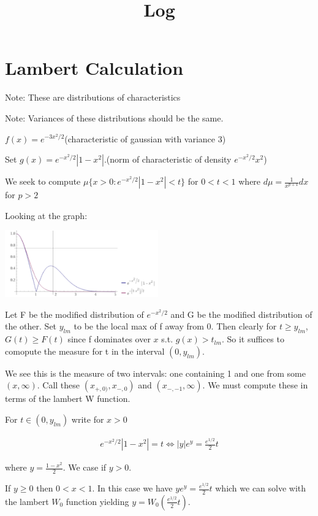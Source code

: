 \documentclass[10pt]{article}
\title{\vspace{-3em}Log}
\newcommand{\1}{\textbf{1}}
\theoremstyle{remark}
\theoremstyle{definition}
\theoremstyle{prop}
\theoremstyle{Corollary}
\begin{document}
\section{Lambert Calculation}

Note: These are distributions of characteristics

Note: Variances of these distributions should be the same.


$f(x) = e^{-3x^2/2}$(characteristic of gaussian with variance 3)

Set $g(x) = e^{-x^2/2}|1-x^2|$.(norm of characteristic of density $e^{-x^2/2}x^2$)

We seek to compute $\mu\{ x > 0: e^{-x^2/2}|1-x^2| < t\}$ for $0 < t < 1$ where $d\mu = \frac{1}{x^{p+1}} dx$ for $p > 2$

Looking at the graph:

\includegraphics[width=250px]{pictures/ex2absdist.PNG}

Let F be the modified distribution of $e^{-x^2/2}$ and G be the modified distribution of the other. Set $y_{lm}$ to be the local max of f away from 0. Then clearly for $t \geq y_{lm}$, $G(t) \geq F(t)$ since f dominates over $x$ s.t. $g(x) > t_{lm}$. So it suffices to comopute the measure for t in the interval $(0,y_{lm})$. 

We see this is the measure of two intervals: one containing 1 and one from some $(x,\infty)$. Call these $(x_{+,0)},x_{-,0})$ and $(x_{-,-1},\infty)$. We must compute these in terms of the lambert W function.

For $t \in (0,y_{lm})$ write for $x > 0$

\begin{align*}
	e^{-x^2/2}|1-x^2| = t \iff |y|e^y = \frac{e^{1/2}}{2}t
\end{align*}

where $y = \frac{1-x^2}{2}$. We case if $y > 0$. 

If $y \geq 0$ then $0 < x < 1$. In this case we have $ye^y = \frac{e^{1/2}}{2}t$ which we can solve with the lambert $W_0$ function yielding $y = W_0(\frac{e^{1/2}}{2}t)$.
\end{document}
